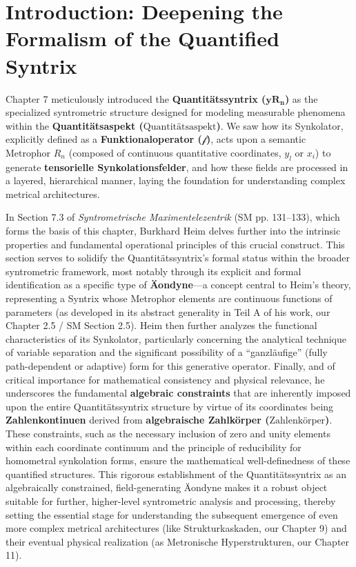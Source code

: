\documentclass[
    12pt,              %
    a4paper,           %
    headings=normal,   %
    twoside=true,      %
    BCOR=8mm,          %
]{scrbook}
\newcommand{\q}[1]{\enquote{#1}}
\newcommand{\quantitaetsaspekt}{\text{Quantitätsaspekt}}
\newcommand{\quantitaetssyntrix}{\bm{yR_n}}
\newcommand{\zahlenkoerper}{\text{Zahlenkörper}}
\newcommand{\semantischermetrophor}{R_n}
\newcommand{\funktionaloperator}{\mathcal{f}}
\begin{document}
\section{Introduction: Deepening the Formalism of the Quantified Syntrix}
\label{sec:ch8_0_intro}

Chapter 7 meticulously introduced the \textbf{Quantitätssyntrix (\(\quantitaetssyntrix\))} as the specialized syntrometric structure designed for modeling measurable phenomena within the \textbf{Quantitätsaspekt (\(\quantitaetsaspekt\))}. We saw how its Synkolator, explicitly defined as a \textbf{Funktionaloperator (\(\funktionaloperator\))}, acts upon a semantic Metrophor \(\semantischermetrophor\) (composed of continuous quantitative coordinates, \(y_l\) or \(x_i\)) to generate \textbf{tensorielle Synkolationsfelder}, and how these fields are processed in a layered, hierarchical manner, laying the foundation for understanding complex metrical architectures.

In Section 7.3 of \textit{Syntrometrische Maximentelezentrik} (SM pp. 131–133), which forms the basis of this chapter, Burkhard Heim delves further into the intrinsic properties and fundamental operational principles of this crucial construct. This section serves to solidify the Quantitätssyntrix’s formal status within the broader syntrometric framework, most notably through its explicit and formal identification as a specific type of \textbf{Äondyne}—a concept central to Heim's theory, representing a Syntrix whose Metrophor elements are continuous functions of parameters (as developed in its abstract generality in Teil A of his work, our Chapter 2.5 / SM Section 2.5). Heim then further analyzes the functional characteristics of its Synkolator, particularly concerning the analytical technique of variable separation and the significant possibility of a \q{ganzläufige} (fully path-dependent or adaptive) form for this generative operator. Finally, and of critical importance for mathematical consistency and physical relevance, he underscores the fundamental \textbf{algebraic constraints} that are inherently imposed upon the entire Quantitätssyntrix structure by virtue of its coordinates being \textbf{Zahlenkontinuen} derived from \textbf{algebraische Zahlkörper (\(\zahlenkoerper\))}. These constraints, such as the necessary inclusion of zero and unity elements within each coordinate continuum and the principle of reducibility for homometral synkolation forms, ensure the mathematical well-definedness of these quantified structures. This rigorous establishment of the Quantitätssyntrix as an algebraically constrained, field-generating Äondyne makes it a robust object suitable for further, higher-level syntrometric analysis and processing, thereby setting the essential stage for understanding the subsequent emergence of even more complex metrical architectures (like Strukturkaskaden, our Chapter 9) and their eventual physical realization (as Metronische Hyperstrukturen, our Chapter 11).
\end{document}
